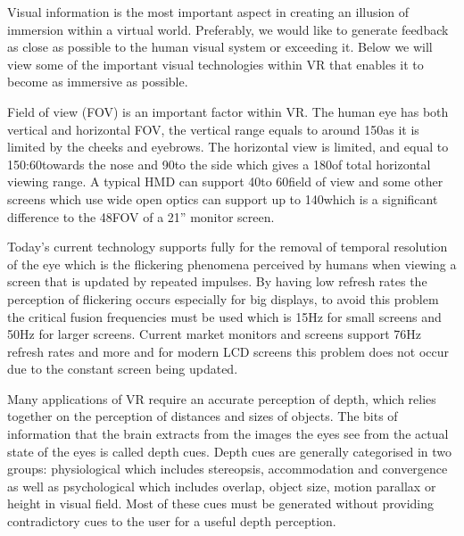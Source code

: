 \documentclass[11pt]{article} %
\begin{document}
Visual information is the most important aspect in creating an illusion of immersion within a virtual world. Preferably, we would like to generate feedback as close as possible to the human visual system or exceeding it. Below we will view some of the important visual technologies within VR that enables it to become as immersive as possible. 
\par

Field of view (FOV) is an important factor within VR. The human eye has both vertical and horizontal FOV, the vertical range equals to around 150\degree  as it is limited by the cheeks and eyebrows. The horizontal view is limited, and equal to 150\degree:60\degree  towards the nose and 90\degree  to the side which gives a 180\degree  of total horizontal viewing range. A typical HMD can support 40\degree to 60\degree  field of view and some other screens which use wide open optics can support up to 140\degree  which is a significant difference to the 48\degree  FOV of a 21” monitor screen.
\par

Today’s current technology supports fully for the removal of temporal resolution of the eye which is the flickering phenomena perceived by humans when viewing a screen that is updated by repeated impulses. By having low refresh rates the perception of flickering occurs especially for big displays, to avoid this problem the critical fusion frequencies must be used which is 15Hz for small screens and 50Hz for larger screens. Current market monitors and screens support 76Hz refresh rates and more and for modern LCD screens this problem does not occur due to the constant screen being updated. 
\par

Many applications of VR require an accurate perception of depth, which relies together on the perception of distances and sizes of objects. The bits of information that the brain extracts from the images the eyes see from the actual state of the eyes is called depth cues. Depth cues are generally categorised in two groups: physiological which includes stereopsis, accommodation and convergence as well as psychological which includes overlap, object size, motion parallax or height in visual field. Most of these cues must be generated without providing contradictory cues to the user for a useful depth perception. 
\par
\end{document}
